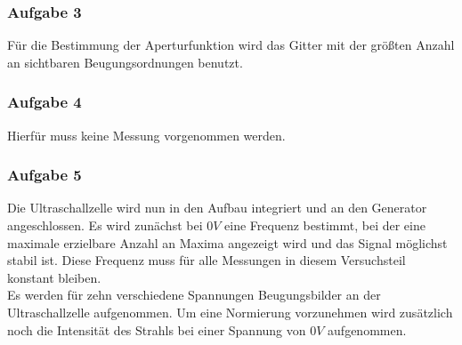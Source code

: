 \subsubsection*{Aufgabe 3}
Für die Bestimmung der Aperturfunktion wird das Gitter mit der größten Anzahl an sichtbaren Beugungsordnungen benutzt.
\subsubsection*{Aufgabe 4}
Hierfür muss keine Messung vorgenommen werden.
\subsubsection*{Aufgabe 5}
Die Ultraschallzelle wird nun in den Aufbau integriert und an den Generator angeschlossen. Es wird zunächst bei $0V$ eine Frequenz bestimmt, bei der eine maximale erzielbare Anzahl an Maxima angezeigt wird und das Signal möglichst stabil ist. Diese Frequenz muss für alle Messungen in diesem Versuchsteil konstant bleiben.\\
Es werden für zehn verschiedene Spannungen Beugungsbilder an der Ultraschallzelle aufgenommen. Um eine Normierung vorzunehmen wird zusätzlich noch die Intensität des Strahls bei einer Spannung von $0V$ aufgenommen.
 